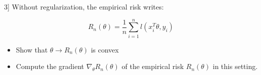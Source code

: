 \documentclass[
10pt, %
a4paper, %
oneside, %
headinclude,footinclude, %
BCOR5mm, %
]{scrartcl}
\begin{document}
3] Without regularization, the empirical risk writes:

\begin{equation}
    R_n(\theta)=\frac{1}{n} \sum^{n}_{i=1} l(x_i^T\theta, y_i)
\end{equation}

\begin{itemize}
    \item[\textbf{a}] Show that $\theta \rightarrow R_n(\theta)$ is convex
    \item[\textbf{b}] Compute the gradient $\nabla_{\theta}R_n(\theta)$ of the empirical risk $R_n(\theta)$ in this setting.
\end{itemize}
\end{document}
